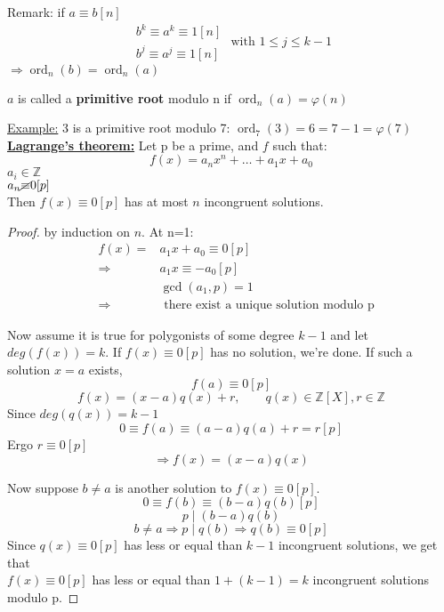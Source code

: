 \documentclass{report}
\newcommand{\nequiv}{\cancel{\equiv}}
\DeclareMathOperator{\ord}{ord}
\begin{document}
Remark: if $a\equiv b [n]$
			\[\begin{array}{lcl}
			b^k\equiv a^k\equiv 1[n]\\
			b^j\equiv a^j\equiv 1[n]
				\end{array} \text{ with } 1 \leq j \leq k-1\]
			$\Rightarrow \ord_n(b)=\ord_n(a)$\\
\begin{defi} $a$ is called a \textbf{primitive root} modulo n if $\ord_n(a)=\varphi(n)$
\end{defi}
\underline{Example:} 3 is a primitive root modulo 7: $\ord_7(3)=6=7-1=\varphi(7)$
\vspace{10mm}\\
\underline{\textbf{Lagrange's theorem:}} Let p be a prime, and $f$ such that:
																					\[f(x)=a_nx^n+\dots+a_1x+a_0\]
																					$a_i\in \mathbb{Z}$\\
																					$a_n \nequiv 0[p]$\\
																					Then  $f(x) \equiv 0[p]$ has at most $n$ incongruent solutions.
\begin{proof} by induction on $n$.
At n=1: \[\begin{array}{lcl}
				&f(x)=&a_1x+a_0\equiv 0[p]\\
				&\Rightarrow& a_1x\equiv -a_0[p]\\
				&&\gcd(a_1,p)=1\\
				&\Rightarrow&\text{ there exist a unique solution modulo p}
				\end{array}\]
				
				Now assume it is true for polygonists of some degree $k-1$ and let $deg(f(x))=k$.
				If $f(x)\equiv0[p]$ has no solution, we're done.
				If such a solution $x=a$ exists,\\ \[f(a)\equiv 0[p]\]
											\[f(x)=(x-a)q(x)+r,\qquad q(x) \in \mathbb{Z}[X], r\in \mathbb{Z}\]
											\newpage
				Since $deg(q(x))=k-1$ \[0 \equiv f(a) \equiv (a-a)q(a)+r=r[p]\]
				Ergo $r\equiv 0[p]$ \[\Rightarrow f(x)=(x-a)q(x)\]
				
				Now suppose $b\neq a$ is another solution to $f(x)\equiv 0[p]$.
															\[0 \equiv f(b) \equiv (b-a)q(b)[p]\]
															\[p \mid (b-a)q(b)\]
															\[b\neq a \Rightarrow p \mid q(b) \Rightarrow q(b) \equiv 0[p]\]
				Since $q(x) \equiv 0[p]$ has less or equal than $k-1$ incongruent solutions, we get that \\
				$f(x) \equiv 0[p]$ has less or equal than $1+(k-1)=k$ incongruent solutions modulo p.
\end{proof}
\end{document}
